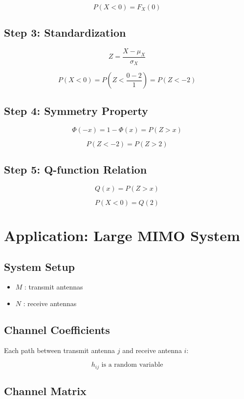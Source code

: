 \documentclass[11pt]{article}
\begin{document}
\[
P(X < 0) = F_X(0)
\]

\subsection*{Step 3: Standardization}

\[
Z = \frac{X - \mu_X}{\sigma_X}
\]

\[
P(X < 0) = P\left(Z < \frac{0 - 2}{1}\right) = P(Z < -2)
\]

\subsection*{Step 4: Symmetry Property}

\[
\Phi(-x) = 1 - \Phi(x) = P(Z > x)
\]

\[
P(Z < -2) = P(Z > 2)
\]

\subsection*{Step 5: Q-function Relation}

\[
Q(x) = P(Z > x)
\]

\[
P(X < 0) = Q(2)
\]

\section{Application: Large MIMO System}

\subsection{System Setup}

\begin{itemize}[noitemsep]
\item $M$ : transmit antennas
\item $N$ : receive antennas
\end{itemize}

\subsection{Channel Coefficients}

Each path between transmit antenna $j$ and receive antenna $i$:

\[
h_{ij} \text{ is a random variable}
\]

\subsection{Channel Matrix}
\end{document}
